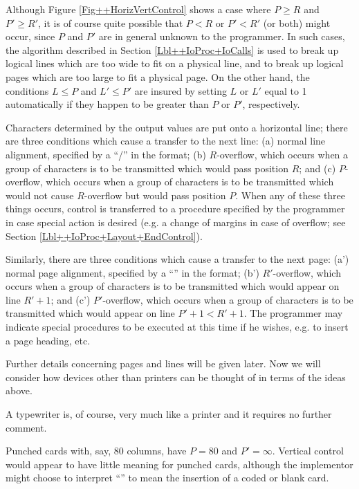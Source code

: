 \documentclass[a4paper,11pt]{article}
\begin{document}
Although Figure \ref{Fig++HorizVertControl} shows a case where $P \geq
R$ and $P' \geq R'$, it is of course quite possible that $P < R$ or
$P' < R'$ (or both) might occur, since $P$ and $P'$ are in general
unknown to the programmer.  In such cases, the algorithm described in
Section \ref{Lbl++IoProc+IoCalls} is used to break up logical lines
which are too wide to fit on a physical line, and to break up logical
pages which are too large to fit a physical page.  On the other hand,
the conditions $L \leq P$ and $L' \leq P'$ are insured by setting $L$
or $L'$ equal to 1 automatically if they happen to be greater than $P$
or $P'$, respectively.

Characters determined by the output values are put onto a horizontal
line; there are three conditions which cause a transfer to the next
line: (a) normal line alignment, specified by a ``/'' in the format;
(b) $R$-overflow, which occurs when a group of characters is to be
transmitted which would pass position $R$; and (c) $P$-overflow, which
occurs when a group of characters is to be transmitted which would not
cause $R$-overflow but would pass position $P$.  When any of these
three things occurs, control is transferred to a procedure specified
by the programmer in case special action is desired (e.g. a change of
margins in case of overflow; see Section
\ref{Lbl++IoProc+Layout+EndControl}).

Similarly, there are three conditions which cause a transfer to the
next page: (a') normal page alignment, specified by a ``\mpow{}'' in the
format; (b') $R'$-overflow, which occurs when a group of characters is
to be transmitted which would appear on line $R'+1$; and (c')
$P'$-overflow, which occurs when a group of characters is to be
transmitted which would appear on line $P'+1 < R'+1$. The programmer
may indicate special procedures to be executed at this time if he
wishes, e.g. to insert a page heading, etc.

Further details concerning pages and lines will be given later. Now we
will consider how devices other than printers can be thought of in
terms of the ideas above.

A typewriter is, of course, very much like a printer and it requires
no further comment.

Punched cards with, say, 80 columns, have $P = 80$ and $P' = \infty$.
Vertical control would appear to have little meaning for punched
cards, although the implementor might choose to interpret ``\mpow{}'' to
mean the insertion of a coded or blank card.
\end{document}
